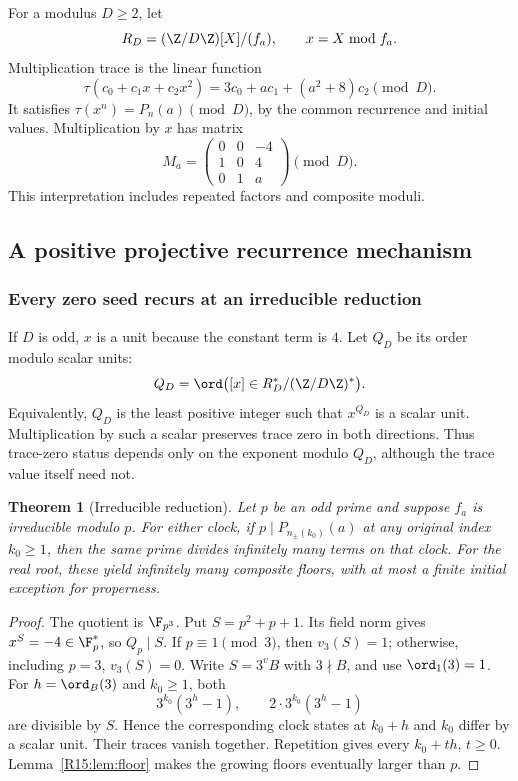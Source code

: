 \documentclass[11pt,a4paper]{article}
\newtheorem{theorem}{Theorem}[section]
\theoremstyle{definition}\newtheorem{definition}[theorem]{Definition}
\theoremstyle{remark}\newtheorem{remark}[theorem]{Remark}
\begin{document}
For a modulus $D\ge2$, let
\[
 R_D=(\Z/D\Z)[X]/(f_a),\qquad x=X\bmod f_a.
\]
Multiplication trace is the linear function
\begin{equation}\label{R15:eq:tau}
 \tau(c_0+c_1x+c_2x^2)=3c_0+ac_1+(a^2+8)c_2\pmod D.
\end{equation}
It satisfies $\tau(x^n)=P_n(a)\pmod D$, by the common recurrence
and initial values. Multiplication by $x$ has matrix
\begin{equation}\label{R15:eq:matrix}
 M_a=\begin{pmatrix}0&0&-4\\1&0&4\\0&1&a\end{pmatrix}\pmod D.
\end{equation}
This interpretation includes repeated factors and composite moduli.

\subsection{A positive projective recurrence mechanism}

\subsubsection{Every zero seed recurs at an irreducible reduction}

If $D$ is odd, $x$ is a unit because the constant term is $4$.
Let $Q_D$ be its order modulo scalar units:
\[
 Q_D=\ord\bigl([x]\in R_D^*/(\Z/D\Z)^*\bigr).
\]
Equivalently, $Q_D$ is the least positive integer such that $x^{Q_D}$
is a scalar unit. Multiplication by such a scalar preserves trace zero
in both directions. Thus trace-zero status depends only on the exponent
modulo $Q_D$, although the trace value itself need not.

\begin{theorem}[Irreducible reduction]\label{R15:thm:irreducible}
Let $p$ be an odd prime and suppose $f_a$ is irreducible modulo $p$.
For either clock, if $p\mid P_{n_\pm(k_0)}(a)$ at any original
index $k_0\ge1$, then the same prime divides infinitely many terms
on that clock. For the real root, these yield infinitely many composite
floors, with at most a finite initial exception for properness.
\end{theorem}
\begin{proof}
The quotient is $\F_{p^3}$. Put $S=p^2+p+1$.
Its field norm gives $x^S=-4\in\F_p^*$, so $Q_p\mid S$.
If $p\equiv1\pmod3$, then $v_3(S)=1$; otherwise, including
$p=3$, $v_3(S)=0$. Write $S=3^v B$ with $3\nmid B$, and use
$\ord_1(3)=1$. For $h=\ord_B(3)$ and $k_0\ge1$, both
\[
 3^{k_0}(3^h-1),\qquad 2\cdot3^{k_0}(3^h-1)
\]
are divisible by $S$. Hence the corresponding clock states at
$k_0+h$ and $k_0$ differ by a scalar unit. Their traces vanish
together. Repetition gives every $k_0+th$, $t\ge0$.
Lemma~\ref{R15:lem:floor} makes the growing floors eventually larger than $p$.
\end{proof}
\end{document}

